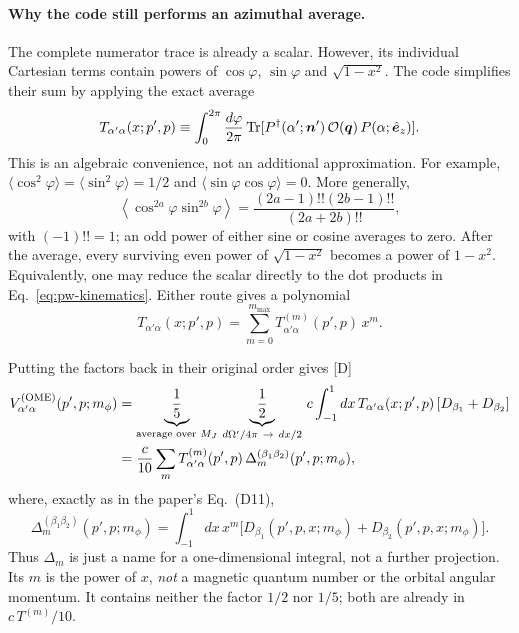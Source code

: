 \documentclass[11pt,a4paper]{article}
\newcommand{\tagD}{\textcolor{orange!85!black}{\textsf{\small[D]}}}
\newcommand{\VOME}{V^{\rm (OME)}}
\newcommand{\D}[2]{\Delta^{(#1)}_{#2}}
\newcommand{\vq}{\bm q}
\newcommand{\vn}{\bm n}
\begin{document}
\paragraph{Why the code still performs an azimuthal average.}
The complete numerator trace is already a scalar. However, its individual Cartesian terms contain powers of $\cos\varphi$, $\sin\varphi$ and $\sqrt{1-x^2}$. The code simplifies their sum by applying the exact average
\begin{equation}
T_{\alpha'\alpha}(x;p',p)
\equiv\int_0^{2\pi}\frac{d\varphi}{2\pi}\,
{\rm Tr}[P^\dagger(\alpha';\vn')\,
\mathcal O(\vq)\,P(\alpha;\hat{\bm e}_z)].
\label{eq:pw-numerator}
\end{equation}
This is an algebraic convenience, not an additional approximation. For example,
$\langle\cos^2\varphi\rangle=\langle\sin^2\varphi\rangle=1/2$ and
$\langle\sin\varphi\cos\varphi\rangle=0$. More generally,
\[
\left\langle\cos^{2a}\varphi\sin^{2b}\varphi\right\rangle
=\frac{(2a-1)!!(2b-1)!!}{(2a+2b)!!},
\]
with $(-1)!!=1$; an odd power of either sine or cosine averages to zero. After the average, every surviving even power of $\sqrt{1-x^2}$ becomes a power of $1-x^2$. Equivalently, one may reduce the scalar directly to the dot products in Eq.~\eqref{eq:pw-kinematics}. Either route gives a polynomial
\[
T_{\alpha'\alpha}(x;p',p)=\sum_{m=0}^{m_{\max}}
T_{\alpha'\alpha}^{(m)}(p',p)\,x^m.
\]

Putting the factors back in their original order gives \tagD
\begin{equation}
\begin{split}
\VOME_{\alpha'\alpha}(p',p;m_\phi)
&=\underbrace{\frac15}_{\text{average over }M_J}\,
\underbrace{\frac12}_{d\Omega'/4\pi\ \to\ dx/2}\,
c\int_{-1}^{1}dx\,
T_{\alpha'\alpha}(x;p',p)\,[D_{\beta_1}+D_{\beta_2}]\\
&=\frac{c}{10}\sum_m T_{\alpha'\alpha}^{(m)}(p',p)\,
\D{\beta_1\beta_2}{m}(p',p;m_\phi),
\end{split}
\label{eq:pw-moments}
\end{equation}
where, exactly as in the paper's Eq.~(D11),
\begin{equation}
\D{\beta_1\beta_2}{m}(p',p;m_\phi)
=\int_{-1}^{1}dx\,x^m
\big[D_{\beta_1}(p',p,x;m_\phi)+D_{\beta_2}(p',p,x;m_\phi)\big].
\label{eq:Delta}
\end{equation}
Thus $\Delta_m$ is just a name for a one-dimensional integral, not a further projection. Its $m$ is the power of $x$, \emph{not} a magnetic quantum number or the orbital angular momentum. It contains neither the factor $1/2$ nor $1/5$; both are already in $c\,T^{(m)}/10$.
\end{document}
